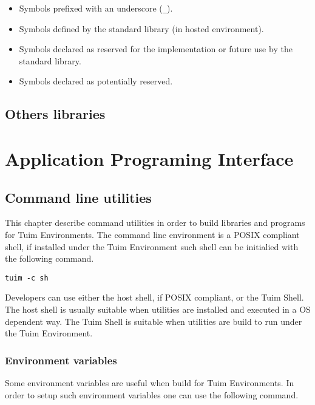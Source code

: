 \documentclass[
   12pt,                         %
   openright,                    %
   twoside,                      %
   a4paper,                      %
   sumario = tradicional,        %
   english,                      %
   xcolor=table                  %
]{abntex2}
\begin{document}
\begin{itemize}
   \item Symbols prefixed with an underscore (\texttt{\_}).
   \item Symbols defined by the standard library (in hosted environment).
   \item Symbols declared as reserved for the implementation
   or future use by the standard library.
   \item Symbols declared as potentially reserved.
\end{itemize}

\chapter{Others libraries}

\part{Application Programing Interface}

\chapter{Command line utilities}

This chapter describe command utilities in order to build
libraries and programs for Tuim Environments.
The command line environment is a POSIX compliant shell,
if installed under the Tuim Environment such shell can be initialied with
the following command.

\begin{lstlisting}[style=bash]
tuim -c sh
\end{lstlisting}

Developers can use either the host shell, if POSIX compliant,
or the Tuim Shell.
The host shell is usually suitable when utilities are installed
and executed in a OS dependent way.
The Tuim Shell is suitable when utilities are build to run
under the Tuim Environment.

\section{Environment variables}

Some environment variables are useful when build for Tuim Environments.
In order to setup such environment variables one can use the following
command.
\end{document}
